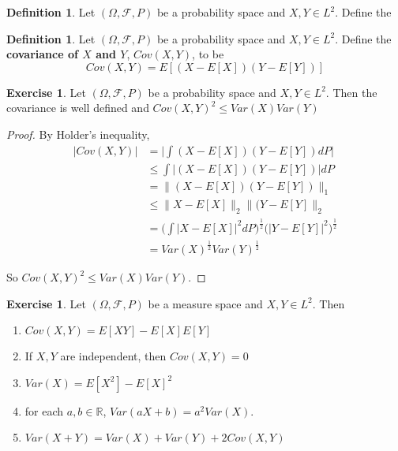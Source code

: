 \documentclass[12pt]{amsart}
\theoremstyle{definition}
\newtheorem{defn}[definition]{Definition}
\newtheorem{ex}[definition]{Exercise}
\newcommand{\Om}{\Omega}
\newcommand{\R}{\mathbb{R}}
\newcommand{\MF}{\mathcal{F}}
\begin{document}
	\begin{defn}
		Let $(\Om, \MF, P)$ be a probability space and $X,Y \in L^2$. Define the  
	\end{defn}
	
	
	\begin{defn}
		Let $(\Om, \MF, P)$ be a probability space and $X,Y \in L^2$. Define the \textbf{covariance of $X$ and $Y$}, $Cov(X,Y)$, to be $$Cov(X,Y) = E[(X-E[X])(Y-E[Y])]$$
	\end{defn}
	
	\begin{ex}
		Let $(\Om, \MF, P)$ be a probability space and $X,Y \in L^2$. Then the covariance is well defined and $Cov(X,Y) ^2 \leq Var(X)Var(Y)$
		
		\begin{proof}
			By Holder's inequality, 
			\begin{align*}
				\vert Cov(X,Y) \vert 
				&= \bigg \vert \int (X-E[X])(Y-E[Y]) dP \bigg \vert \\
				&\leq \int \vert (X-E[X])(Y-E[Y]) \vert dP \\
				&= \|(X-E[X])(Y-E[Y]) \|_1 \\
				&\leq \|X-E[X] \|_2 \|(Y-E[Y] \|_2  \\
				&= \bigg(\int \vert X - E[X] \vert^2 dP\bigg)^{\frac{1}{2}} \bigg( \vert Y - E[Y] \vert^2 \bigg)^{\frac{1}{2}} \\
				&= Var(X)^{\frac{1}{2}}Var(Y)^{\frac{1}{2}}
			\end{align*}
			
			So $Cov(X,Y) ^2 \leq Var(X)Var(Y)$.
		\end{proof}
		
	\end{ex}
	
	\begin{ex}
		Let $(\Om, \MF, P)$ be a measure space and $X,Y \in L^2$. Then
		\begin{enumerate}
			\item $Cov(X,Y) = E[XY]-E[X]E[Y]$
			\item If $X,Y$ are independent, then $Cov(X,Y) = 0$
			\item $Var(X) = E[X^2] - E[X]^2$
			\item for each $a,b \in \R$, $Var(aX + b) = a^2Var(X)$.
			\item $Var(X+Y) = Var(X) + Var(Y) + 2 Cov(X,Y)$
		\end{enumerate}
	\end{ex}
	
\end{document}
